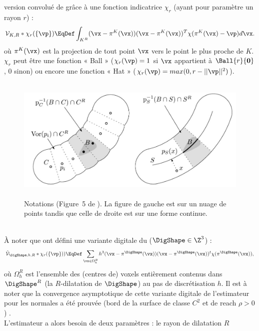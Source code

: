 version convolué de \VCM grâce à une fonction indicatrice $\chi_r$
(ayant pour paramètre un rayon $r$) :
%
\begin{equation}
  \mathcal{V}_{K,R} \ast \chi_r(\{\vp\}) \EqDef \int_{K^R} (\vx - \pi^K(\vx))(\vx - \pi^K(\vx))^T \chi(\pi^K(\vx) - \vp) d\vx .
\end{equation}
%
où $\pi^K(\vx)$ est la projection de tout point $\vx$ vers le point le plus proche de
$K$. $\chi_r$ peut être une fonction « Ball » ($\chi_r(\vp) = 1$ si $\vx$
appartient à $\Ball{r}{\mathbf{0}}$, $0$ sinon) ou encore une fonction « Hat »
($\chi_r(\vp) = max(0, r - ||\vp||^2)$).
%
\begin{figure}[ht]{
    \begin{center}
    \includegraphics[height=6cm]{images/Feature/VCM_notations}
    \end{center}}
    \caption[Notations.]{Notations (Figure~5 de \cite{Merigot2011}). La figure de gauche est sur un nuage de points tandis que celle de droite est sur une forme continue. \label{fig:mellado-multiscale}}
\end{figure}
%
\\
%
À noter que  ont défini une variante digitale du
\VCM ($\DigShape \in \Z^3$) :
%
\begin{equation}
  \hat{\mathcal{V}}_{\DigShape,h,R} \ast \chi_r(\{\vp\})) \EqDef \sum_{\vx \in \Omega_h^R} h^3 (\vx - \pi^{\DigShape}(\vx)) (\vx - \pi^{\DigShape}(\vx))^t \chi(\pi^{\DigShape}(\vx)) ,
\end{equation}
%
où $\Omega_h^R$ est l'ensemble des (centres de) voxels entièrement contenus dans
$\DigShape^R$ (la $R$-dilatation de $\DigShape$) au pas de discrétisation $h$.
%
Il est à noter que la convergence asymptotique de cette variante digitale de
l'estimateur \VCM pour les normales a été prouvée (bord de la surface de classe
$C^2$ et de reach $\rho > 0$) \cite{Cuel2014DGCI}.
%
\\
%
L'estimateur \VCM a alors besoin de deux paramètres : le rayon de dilatation $R$
